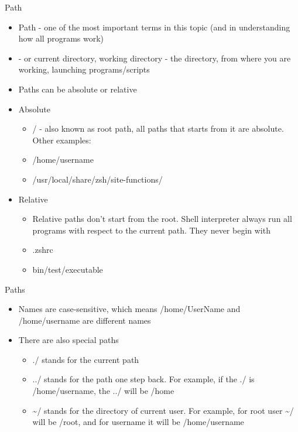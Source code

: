 \documentclass[usenames,dvipsnames,10pt,aspectratio=169]{beamer}
\begin{document}
\begin{frame}{Path}
    \begin{itemize}
        \item  {\color{ucugreen} Path} - one of the most important terms in this topic (and in understanding how all programs work)
        \item {} - or current directory, working directory - the directory, from where you are working, launching programs/scripts
        \item Paths can be absolute or relative
        \item Absolute
            \begin{itemize}
                \item {\color{ucugreen} /} - also known as  {\color{ucugreen} root path}, all paths that starts from it are {\color{ucugreen} absolute}. Other examples:
                \item {\color{ucugreen} /home/username}
                \item {\color{ucugreen} /usr/local/share/zsh/site-functions/}
            \end{itemize}
        \item Relative
            \begin{itemize}
                \item Relative paths don't start from the root. Shell interpreter always run all programs with respect to the current path. They never begin with \ex{/}
                \item {\color{ucugreen} .zshrc}
                \item {\color{ucugreen} bin/test/executable}
            \end{itemize}
    \end{itemize}
\end{frame}

\begin{frame}{Paths}
    \begin{itemize}
        \item Names are case-sensitive, which means {\color{ucugreen} /home/UserName} and {\color{ucugreen} /home/username} are different names
        \item There are also special paths
        \begin{itemize}
            \item {\color{ucugreen} ./} stands for the current path
            \item {\color{ucugreen} ../} stands for the path one step back. For example, if the {\color{ucugreen} ./} is {\color{ucugreen} /home/username}, the {\color{ucugreen} ../} will be {\color{ucugreen} /home}
            \item {\color{ucugreen} \textasciitilde /} stands for the directory of current user. For example, for {\color{ucugreen} root} user {\color{ucugreen} \textasciitilde/} will be {\color{ucugreen} /root}, and for {\color{ucugreen} username} it will be {\color{ucugreen} /home/username}
        \end{itemize}
    \end{itemize}
\end{frame}
\end{document}
